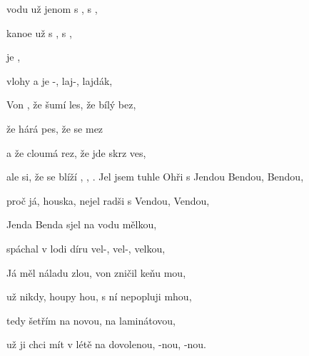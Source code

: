 
\zs
{} vodu už  jenom s , s ,

 kanoe  už s , s ,

   je ,

 vlohy a je -, laj-, lajdák,
\ks

\zr
Von , že šumí les, že  bílý bez,

že  hárá pes, že  se mez

a že  cloumá rez, že  jde skrz ves,

ale  si, že se blíží , , .
\kr
\zs
Jel jsem tuhle Ohři s Jendou Bendou, Bendou,

proč já, houska, nejel radši s Vendou, Vendou,

Jenda Benda sjel na vodu mělkou, 

spáchal v lodi díru vel-, vel-, velkou,
\ks

\zr
Já měl náladu zlou, von zničil keňu mou,

už nikdy, houpy hou, s ní nepopluji mhou,

tedy šetřím na novou, na laminátovou,

už ji chci mít v létě na dovolenou, -nou, -nou.
\kr
\kp

